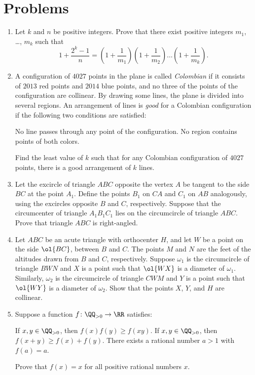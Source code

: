 \documentclass[11pt]{scrartcl}
\begin{document}
\section{Problems}
\begin{enumerate}[\bfseries 1.]
\item %
Let  $k$ and $n$ be positive integers.
Prove that there exist positive integers $m_1$, \dots, $m_k$
such that
\[ 1 + \frac{2^k-1}{n}
  = \left( 1 + \frac{1}{m_1} \right)
  \left( 1 + \frac{1}{m_2} \right)
  \dots
  \left( 1 + \frac{1}{m_k} \right).
\]

\item %
A configuration of $4027$ points in the plane is called
\emph{Colombian} if it consists of $2013$ red points and $2014$ blue points,
and no three of the points of the configuration are collinear.
By drawing some lines, the plane is divided into several regions.
An arrangement of lines is \emph{good} for a Colombian configuration
if the following two conditions are satisfied:
\begin{enumerate}
  \ii[(i)] No line passes through any point of the configuration.
  \ii[(ii)] No region contains points of both colors.
\end{enumerate}
Find the least value of $k$ such that for any Colombian configuration
of $4027$ points, there is a good arrangement of $k$ lines.

\item %
Let the excircle of triangle $ABC$ opposite
the vertex $A$ be tangent to the side $BC$ at the point $A_1$.
Define the points $B_1$ on $CA$ and $C_1$ on $AB$ analogously,
using the excircles opposite $B$ and $C$, respectively.
Suppose that the circumcenter of triangle $A_1B_1C_1$ lies
on the circumcircle of triangle $ABC$.
Prove that triangle $ABC$ is right-angled.

\item %
Let $ABC$ be an acute triangle with orthocenter $H$,
and let $W$ be a point on the side $\ol{BC}$, between $B$ and $C$.
The points $M$ and $N$ are the feet of the altitudes
drawn from $B$ and $C$, respectively.
Suppose $\omega_1$ is the circumcircle of triangle $BWN$
and $X$ is a point such that $\ol{WX}$ is a diameter of $\omega_1$.
Similarly, $\omega_2$ is the circumcircle of triangle $CWM$
and $Y$ is a point such that $\ol{WY}$ is a diameter of $\omega_2$.
Show that the points $X$, $Y$, and $H$ are collinear.

\item %
Suppose a function $f \colon \QQ_{>0} \to \RR$ satisfies:
\begin{enumerate}
  \ii [(i)] If $x,y \in \QQ_{>0}$, then $f(x)f(y) \ge f(xy)$.
  \ii [(ii)] If $x,y \in \QQ_{>0}$, then $f(x+y) \ge f(x) + f(y)$.
  \ii [(iii)] There exists a rational number $a > 1$ with $f(a) = a$.
\end{enumerate}
Prove that $f(x) = x$ for all positive rational numbers $x$.


\end{enumerate}
\end{document}
